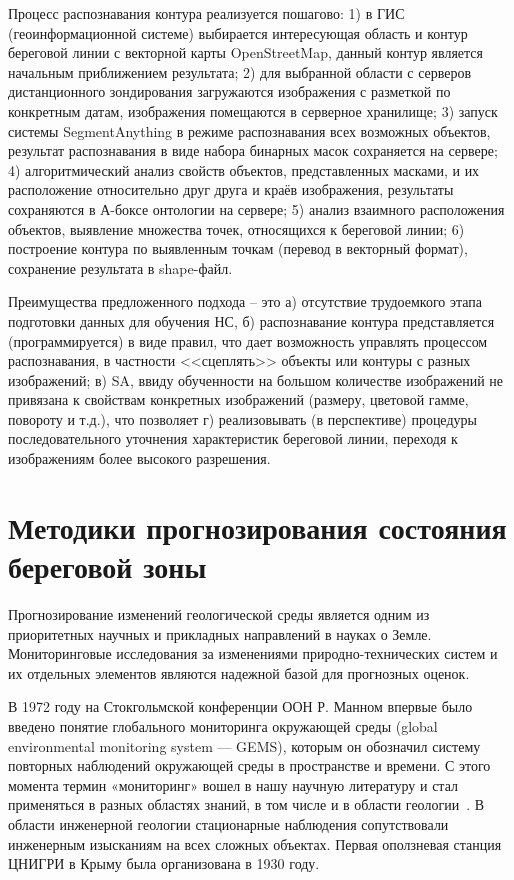 \documentclass[732,14pt,final]{studrep}
\begin{document}
Процесс распознавания контура реализуется пошагово: 1) в ГИС (геоинформационной системе) выбирается интересующая область и контур береговой линии с векторной карты OpenStreetMap, данный контур является начальным приближением результата; 2) для выбранной области с серверов дистанционного зондирования загружаются изображения с разметкой по конкретным датам, изображения помещаются в серверное хранилище; 3) запуск системы SegmentAnything в режиме распознавания всех возможных объектов, результат распознавания в виде набора бинарных масок сохраняется на сервере; 4) алгоритмический анализ свойств объектов, представленных масками, и их расположение относительно друг друга и краёв изображения, результаты сохраняются в А-боксе онтологии на сервере; 5) анализ взаимного расположения объектов, выявление множества точек, относящихся к береговой линии; 6) построение контура по выявленным точкам (перевод в векторный формат), сохранение результата в shape-файл.

Преимущества предложенного подхода -- это а) отсутствие трудоемкого этапа подготовки данных для обучения НС, б) распознавание контура представляется (программируется) в виде правил, что дает возможность управлять процессом распознавания, в частности <<сцеплять>> объекты или контуры с разных изображений; в) SA, ввиду обученности на большом количестве изображений не привязана к свойствам конкретных изображений (размеру, цветовой гамме, повороту и т.д.), что позволяет г) реализовывать (в перспективе) процедуры последовательного уточнения характеристик береговой линии, переходя к изображениям более высокого разрешения.

\chapter{Методики прогнозирования состояния береговой зоны}\label{chap:techniques}

Прогнозирование изменений геологической среды является одним из приоритетных научных и прикладных направлений в науках о Земле. Мониторинговые исследования за изменениями природно-технических систем и их отдельных элементов являются надежной базой для прогнозных оценок.

В 1972 году на Стокгольмской конференции ООН Р. Манном впервые было введено понятие глобального мониторинга окружающей среды (global environmental monitoring system — GEMS), которым он обозначил систему повторных наблюдений окружающей среды в пространстве и времени. С этого момента термин «мониторинг» вошел в нашу научную литературу и стал применяться в разных областях знаний, в том числе и в области геологии~\cite{ivanov01}. В области инженерной геологии стационарные наблюдения сопутствовали инженерным изысканиям на всех сложных объектах. Первая оползневая станция ЦНИГРИ в Крыму была организована в 1930 году.
\end{document}

